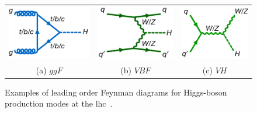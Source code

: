 \begin{figure}[htbp]
    \centering
    \begin{tabular}{ccc}
        \includegraphics[width=0.3\linewidth]{images/ggF.png}  &
        \includegraphics[width=0.3\linewidth]{images/VBF.png}  &
        \includegraphics[width=0.3\linewidth]{images/VH.png}   \\
        (a) $ggF$ & (b) $VBF$ & (c) $VH$ \\
    \end{tabular}
    \vspace{0.5em} %
    \caption{
    Examples of leading order Feynman diagrams for Higgs-boson production modes at the \acrshort{lhc}~\cite{Nature_ATLAS}.}
    \label{fig:higgs_production}
\end{figure}


